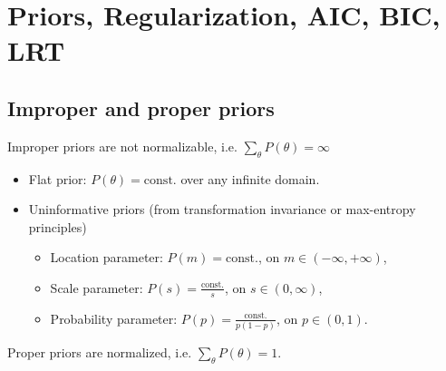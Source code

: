 \newpage
\section{Priors, Regularization, AIC, BIC, LRT}


\subsection{Improper and proper priors}
\no Improper priors are not normalizable, i.e. $\sum_\theta P(\theta) = \infty$
\begin{itemize}
	\item Flat prior: $P(\theta) = \text{const.}$ over any infinite domain.
	\item Uninformative priors (from transformation invariance or max-entropy principles)
	\begin{itemize}
		\item Location parameter: $P(m) = \text{const.}$, on $m \in (-\infty, +\infty)$,
		\item Scale parameter: $P(s) = \frac{\text{const.}}{s}$, on $s\in (0, \infty)$,
		\item Probability parameter: $P(p) = \frac{\text{const.}}{p(1-p)}$, on $p\in(0,1)$.
	\end{itemize}
\end{itemize}
Proper priors are normalized, i.e. $\sum_\theta P(\theta) = 1$.

